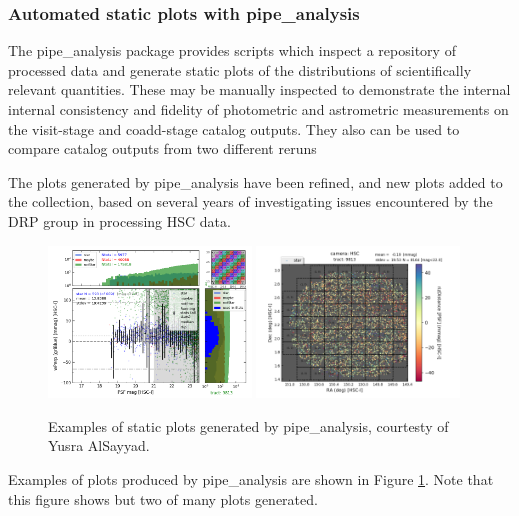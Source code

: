 \documentclass[DM,authoryear,toc,lsstdraft]{lsstdoc}
\begin{document}
\subsubsection{Automated static plots with pipe\_analysis}
\label{sec:current:drp:pipeanalysis}

The pipe\_analysis package provides scripts which inspect a repository of
processed data and generate static plots of the distributions of
scientifically relevant quantities. These may be manually inspected to
demonstrate the internal internal consistency and fidelity of photometric and
astrometric measurements on the visit-stage and coadd-stage catalog outputs.
They also can be used to compare catalog outputs from two different reruns

The plots generated by pipe\_analysis have been refined, and new plots added
to the collection, based on several years of investigating issues encountered
by the DRP group in processing HSC data.

\begin{figure}
\begin{center}
\includegraphics[width=0.48\textwidth]{figures/plot-t9813-color_wPerp-psfMagHist.png}
\includegraphics[width=0.48\textwidth]{figures/plot-t9813-rizDistancePSF-sky-stars.png}
\end{center}
\caption{Examples of static plots generated by pipe\_analysis, courtesty of Yusra
AlSayyad.}
\label{fig:pipeanalysis}
\end{figure}

Examples of plots produced by pipe\_analysis are shown in Figure
\ref{fig:pipeanalysis}. Note that this figure shows but two of many plots
generated.
\end{document}
